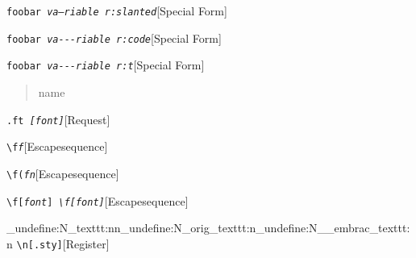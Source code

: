 \documentclass{book}
\begin{document}
%
\noindent\texttt{foobar \EmbracOn{}\textnormal{\textsl{\EmbracOff{}\textnormal{\textsl{va---riable}}\EmbracOn{} r:slanted}}\EmbracOff{}}\hfill[Special Form]



%
\noindent\texttt{foobar \EmbracOn{}\textnormal{\textsl{\EmbracOff{}\textnormal{\texttt{va{-}{-}{-}riable}}\EmbracOn{} r:code}}\EmbracOff{}}\hfill[Special Form]



%
\noindent\texttt{foobar \EmbracOn{}\textnormal{\textsl{\EmbracOff{}\textnormal{\texttt{va{-}{-}{-}riable}}\EmbracOn{} r:t}}\EmbracOff{}}\hfill[Special Form]



%
\begin{quote}
\unskip{\parskip=0pt\noindent}%
name
\end{quote}

\noindent\texttt{\texttt{.ft} \EmbracOn{}\textnormal{\textsl{[\EmbracOff{}\textnormal{\textsl{font}}\EmbracOn{}]}}\EmbracOff{}}\hfill[Request]



%
\noindent\texttt{\texttt{\textbackslash{}f}\textnormal{\textsl{f}}\texttt{}}\hfill[Escape\hbox{}sequence]



%
\noindent\texttt{\texttt{\textbackslash{}f(}\textnormal{\textsl{fn}}\texttt{}}\hfill[Escape\hbox{}sequence]



%
\noindent\texttt{\texttt{\textbackslash{}f[}\textnormal{\textsl{font}}\texttt{]} \EmbracOn{}\textnormal{\textsl{\texttt{\textbackslash{}f[}\EmbracOff{}\textnormal{\textsl{font}}\EmbracOn{}\texttt{]}}}\EmbracOff{}}\hfill[Escape\hbox{}sequence]


\ExplSyntaxOn%
\cs_undefine:N{\embrac_texttt:nn}\cs_undefine:N{\embrac_orig_texttt:n}\cs_undefine:N{\__embrac_texttt:n}%
\ExplSyntaxOff%
%
\noindent\texttt{\texttt{\textbackslash{}n[.sty]}}\hfill[Register]
\end{document}
